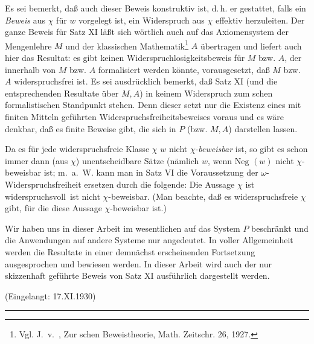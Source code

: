 \documentclass[draft]{scrartcl}
\newcounter{commentaryNumber}
\begin{document}
Es sei bemerkt, daß auch dieser Beweis konstruktiv ist, d.\,h. er gestattet, falls ein \textit{Beweis} aus $\chi$ für $w$ vorgelegt ist, ein Widerspruch aus $\chi$ effektiv herzuleiten. Der ganze Beweis für Satz XI läßt sich wörtlich auch auf das Axiomensystem der Mengenlehre $M$ und der klassischen Mathematik\footnote{Vgl. J.~v.~, Zur schen Beweistheorie, Math. Zeitschr. 26, 1927.}
$A$ übertragen und liefert auch hier das Resultat: es gibt keinen 
Widerspruchlosigkeitsbeweis für $M$ bzw. $A$, der innerhalb von $M$ bzw. $A$ formalisiert werden könnte, vorausgesetzt,
daß $M$ bzw. $A$ widerspruchsfrei ist. Es sei ausdrücklich bemerkt, daß Satz XI 
(und die entsprechenden Resultate über $M, A$) in keinem Widerspruch zum schen 
formalistischen Standpunkt stehen. Denn dieser setzt nur die Existenz eines mit finiten 
Mitteln geführten Widerspruchsfreiheitsbeweises voraus und es wäre denkbar, daß es finite 
Beweise gibt, die sich in $P$ (bzw. $M, A$)  darstellen lassen.

Da es für jede widerspruchsfreie Klasse $\chi$ $w$ nicht 
$\chi$-\textit{beweisbar} ist, so gibt es schon immer dann 
(aus $\chi$) unentscheidbare Sätze (nämlich $w$, wenn 
$\text{Neg }\left(w\right)$ nicht $\chi$-beweisbar ist; 
m.~a.~W. kann man in Satz VI die Voraussetzung der
$\omega$-Widerspruchsfreiheit ersetzen durch die folgende: 
Die Aussage \glqq $\chi$ ist widerspruchsvoll\grqq\ ist 
nicht $\chi$-beweisbar. (Man beachte, daß es widerspruchsfreie 
$\chi$ gibt, für die diese Aussage $\chi$-beweisbar ist.)

Wir haben uns in dieser Arbeit im wesentlichen auf das System $P$ 
beschränkt und die Anwendungen auf andere Systeme nur angedeutet. 
In voller Allgemeinheit werden die Resultate in einer demnächst 
erscheinenden Fortsetzung ausgesprochen und bewiesen werden. 
In dieser Arbeit wird auch der nur skizzenhaft geführte Beweis
von Satz XI ausführlich dargestellt werden.

\begin{center}
(Eingelangt: 17.XI.1930)
\end{center}
\vspace{0.5cm}
\begin{center}
\rule{2cm}{0.01cm}
\end{center}
\end{document}
